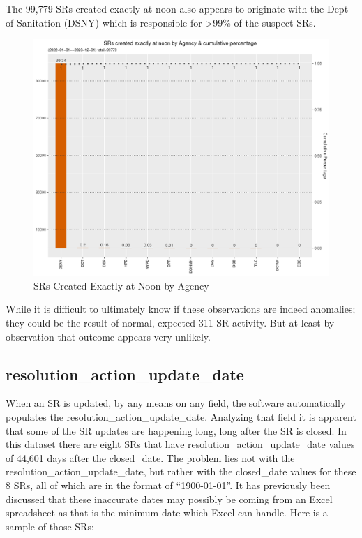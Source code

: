 \documentclass[12pt, titlepage]{article}
\begin{document}
{	The 99,779 SRs created-exactly-at-noon also appears to originate with the Dept of Sanitation (DSNY) which
	is responsible for \textgreater99\% of the suspect SRs.
	
	\begin{figure}[tbp]
		\centering
		\includegraphics[width = \textwidth]{created_at_noon_chart.pdf}
		\caption{SRs Created Exactly at Noon by Agency}
		\label{fig:noon-created}
	\end{figure}		
		
	While it is difficult to ultimately know if these observations are indeed anomalies; they could be the result of normal, expected
	311 SR activity. But at least by observation that outcome appears very unlikely.	
		
	\subsection{resolution\_action\_update\_date}
	When an SR is updated, by any means on any field, the software automatically populates the resolution\_action\_update\_date. Analyzing that field
	it is apparent that some of the SR updates are happening long, long after the SR is closed. In this dataset there are eight SRs that have 
	resolution\_action\_update\_date values of 44,601 days after the closed\_date. The problem lies not with the resolution\_action\_update\_date, but
	rather with the closed\_date values for these 8 SRs, all of which are in the format of ``1900-01-01''. It has previously been discussed that these
	inaccurate dates may possibly be coming from an Excel spreadsheet as that is the minimum date which Excel can handle. Here is a sample
	of those SRs:

}
\end{document}
